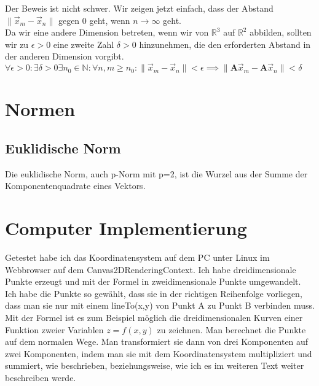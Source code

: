 \documentclass[a4paper]{article}
\begin{document}
\begin{example}
Der Beweis ist nicht schwer. Wir zeigen jetzt einfach, dass der Abstand $\|\vec{x}_m - \vec{x}_n\|$ gegen $0$ geht, wenn $n\rightarrow \infty$ geht.\\

Da wir eine andere Dimension betreten, wenn wir von $\mathbb{R}^{3}$ auf $\mathbb{R}^{2}$ abbilden, sollten wir zu $\epsilon > 0$ eine zweite Zahl $\delta > 0$ hinzunehmen, die den erforderten Abstand in der anderen Dimension vorgibt.\\

$\forall \epsilon > 0 : \exists \delta > 0 \exists n_{0} \in \mathbb{N} : \forall n,m \geq n_{0} : \|\vec{x}_{m}-\vec{x}_{n}\| < \epsilon \implies \|\boldsymbol{A}\vec{x}_m - \boldsymbol{A}\vec{x}_n\| < \delta$

\section{Normen}

\subsection{Euklidische Norm}

Die euklidische Norm, auch p-Norm mit p=2, ist die Wurzel aus der Summe der Komponentenquadrate eines Vektors.




\section{Computer Implementierung}

Getestet habe ich das Koordinatensystem auf dem PC unter Linux im Webbrowser auf dem Canvas2DRenderingContext. Ich habe dreidimensionale Punkte erzeugt und mit der Formel in zweidimensionale Punkte umgewandelt. Ich habe die Punkte so gew\"ahlt,
dass sie in der richtigen Reihenfolge vorliegen, dass man sie nur mit einem lineTo(x,y) von Punkt A zu Punkt B verbinden muss.\\


Mit der Formel ist es zum Beispiel m\"oglich die dreidimensionalen Kurven einer Funktion zweier Variablen $z=f(x,y)$ zu zeichnen.
Man berechnet die Punkte auf dem normalen Wege. Man transformiert sie dann von drei Komponenten auf zwei Komponenten, indem man sie
mit dem Koordinatensystem multipliziert und summiert, wie beschrieben, beziehungsweise, wie ich es im weiteren Text weiter beschreiben werde.\\



\end{example}
\end{document}
